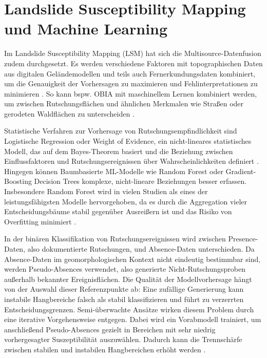 \documentclass[../main.tex]{subfiles}
\begin{document}
\section{Landslide Susceptibility Mapping und Machine Learning}

Im Landslide Susceptibility Mapping (LSM) hat sich die Multisource-Datenfusion zudem durchgesetzt. Es werden verschiedene Faktoren mit topographischen Daten aus digitalen Geländemodellen und teils auch Fernerkundungsdaten kombiniert, um die Genauigkeit der Vorhersagen zu maximieren und Fehlinterpretationen zu minimieren \autocite{jinAccurateLandslideIdentification2022, kaabRemoteSensingGlacier2005, yuLandslideSusceptibilityMapping2023}. So kann bspw. OBIA mit maschinellem Lernen kombiniert werden, um zwischen Rutschungsflächen und ähnlichen Merkmalen wie Straßen oder gerodeten Waldflächen zu unterscheiden \autocite{jiaNonlandslideSampleLandslide2025, wenSHAPenhancedXGBoostModel2024, jinAccurateLandslideIdentification2022, strzabalaIdentificationLandslidePrecursors2024}.

Statistische Verfahren zur Vorhersage von Rutschungsempfindlichkeit sind Logistische Regression oder Weight of Evidence, ein nicht-lineares statistisches Modell, das auf dem Bayes-Theorem basiert und die Beziehung zwischen Einflussfaktoren und Rutschungsereignissen über Wahrscheinlichkeiten definiert \autocite{piacentiniStatisticalAnalysisAssessing2012, goetzEvaluatingMachineLearning2015}. Hingegen können Baumbasierte ML-Modelle wie Random Forest oder Gradient-Boosting Decision Trees komplexe, nicht-lineare Beziehungen besser erfassen. Insbesondere Random Forest wird in vielen Studien als eines der leistungsfähigsten Modelle hervorgehoben, da es durch die Aggregation vieler Entscheidungsbäume stabil gegenüber Ausreißern ist und das Risiko von Overfitting minimiert \autocite{jiaNonlandslideSampleLandslide2025, goetzEvaluatingMachineLearning2015, huangModellingLandslideSusceptibility2024, yuLandslideSusceptibilityMapping2023}.

In der binären Klassifikation von Rutschungsereignissen wird zwischen Presence-Daten, also dokumentierte Rutschungen, und Absence-Daten unterschieden. Da Absence-Daten im geomorphologischen Kontext nicht eindeutig bestimmbar sind, werden Pseudo-Absences verwendet, also generierte Nicht-Rutschungsproben außerhalb bekannter Ereignisflächen. Die Qualität der Modellvorhersage hängt von der Auswahl dieser Referenzpunkte ab: Eine zufällige Generierung kann instabile Hangbereiche falsch als stabil klassifizieren und führt zu verzerrten Entscheidungsgrenzen. Semi-überwachte Ansätze wirken diesem Problem durch eine iterative Vorgehensweise entgegen. Dabei wird ein Vorabmodell trainiert, um anschließend Pseudo-Absences gezielt in Bereichen mit sehr niedrig vorhergesagter Suszeptibilität auszuwählen. Dadurch kann die Trennschärfe zwischen stabilen und instabilen Hangbereichen erhöht werden \autocite{piacentiniStatisticalAnalysisAssessing2012}.
\end{document}
